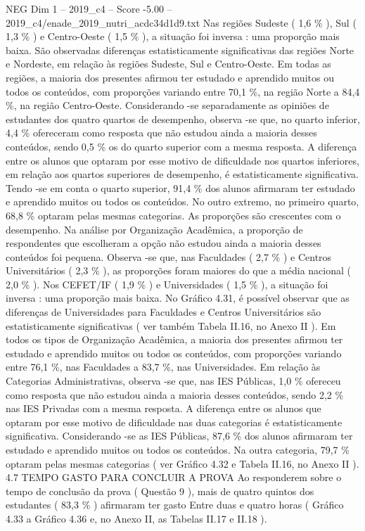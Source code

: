 \begin{textsample}{NEG Dim 1 – 2019\_c4 – Score -5.00 – 2019\_c4/enade\_2019\_nutri\_acdc34d1d9.txt}
Nas regiões Sudeste ( 1,6 \% ), Sul ( 1,3 \% ) e Centro-Oeste ( 1,5 \% ), a situação foi inversa : uma proporção mais baixa.
São observadas diferenças estatisticamente significativas das regiões Norte e Nordeste, em relação às regiões Sudeste, Sul e Centro-Oeste.
Em todas as regiões, a maioria dos presentes afirmou ter estudado e aprendido muitos ou todos os conteúdos, com proporções variando entre 70,1 \%, na região Norte a 84,4 \%, na região Centro-Oeste.
Considerando -se separadamente as opiniões de estudantes dos quatro quartos de desempenho, observa -se que, no quarto inferior, 4,4 \% ofereceram como resposta que não estudou ainda a maioria desses conteúdos, sendo 0,5 \% os do quarto superior com a mesma resposta.
A diferença entre os alunos que optaram por esse motivo de dificuldade nos quartos inferiores, em relação aos quartos superiores de desempenho, é estatisticamente significativa.
Tendo -se em conta o quarto superior, 91,4 \% dos alunos afirmaram ter estudado e aprendido muitos ou todos os conteúdos.
No outro extremo, no primeiro quarto, 68,8 \% optaram pelas mesmas categorias.
As proporções são crescentes com o desempenho.
Na análise por Organização Acadêmica, a proporção de respondentes que escolheram a opção não estudou ainda a maioria desses conteúdos foi pequena.
Observa -se que, nas Faculdades ( 2,7 \% ) e Centros Universitários ( 2,3 \% ), as proporções foram maiores do que a média nacional ( 2,0 \% ).
Nos CEFET/IF ( 1,9 \% ) e Universidades ( 1,5 \% ), a situação foi inversa : uma proporção mais baixa.
No Gráfico 4.31, é possível observar que as diferenças de Universidades para Faculdades e Centros Universitários são estatisticamente significativas ( ver também Tabela II.16, no Anexo II ).
Em todos os tipos de Organização Acadêmica, a maioria dos presentes afirmou ter estudado e aprendido muitos ou todos os conteúdos, com proporções variando entre 76,1 \%, nas Faculdades a 83,7 \%, nas Universidades.
Em relação às Categorias Administrativas, observa -se que, nas IES Públicas, 1,0 \% ofereceu como resposta que não estudou ainda a maioria desses conteúdos, sendo 2,2 \% nas IES Privadas com a mesma resposta.
A diferença entre os alunos que optaram por esse motivo de dificuldade nas duas categorias é estatisticamente significativa.
Considerando -se as IES Públicas, 87,6 \% dos alunos afirmaram ter estudado e aprendido muitos ou todos os conteúdos.
Na outra categoria, 79,7 \% optaram pelas mesmas categorias ( ver Gráfico 4.32 e Tabela II.16, no Anexo II ). 4.7 TEMPO GASTO PARA CONCLUIR A PROVA Ao responderem sobre o tempo de conclusão da prova ( Questão 9 ), mais de quatro quintos dos estudantes ( 83,3 \% ) afirmaram ter gasto Entre duas e quatro horas ( Gráfico 4.33 a Gráfico 4.36 e, no Anexo II, as Tabelas II.17 e II.18 ).

\end{textsample}
